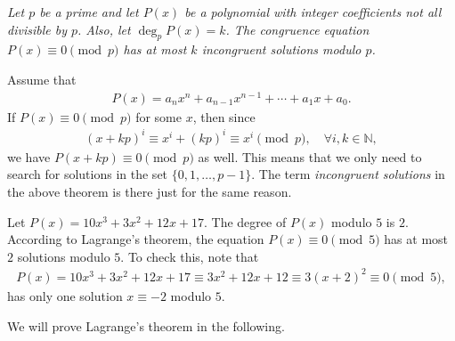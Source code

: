 \documentclass[12pt]{subfile}
\begin{document}
		
		\begin{theorem}\slshape\label{thm:lagrange}
			Let $p$ be a prime and let $P(x)$ be a polynomial with integer coefficients not all divisible by $p$. Also, let $\deg_p P(x) = k$. The congruence equation $P(x)\equiv0\pmod p$ has at most $k$ incongruent solutions modulo $p$.
		\end{theorem}
		
		\begin{note}
			Assume that
				\begin{align*}
				P(x)=a_nx^n + a_{n-1}x^{n-1} + \cdots + a_1 x +a_0.
				\end{align*}
			If $P(x) \equiv 0 \pmod p$ for some $x$, then since
				\begin{align*}
					(x+kp)^i \equiv x^i + (kp)^i \equiv x^i \pmod p, \quad \forall i,k \in \mathbb N,
				\end{align*}
			we have $P(x+kp) \equiv 0 \pmod p$ as well. This means that we only need to search for solutions in the set $\{0, 1, \ldots, p-1\}$. The term \textit{incongruent solutions} in the above theorem is there just for the same reason.
		\end{note}
		
		
		\begin{example}
			Let $P(x)=10x^3+3x^2 + 12x+17$.  The degree of $P(x)$ modulo $5$ is $2$. According to Lagrange's theorem, the equation $P(x) \equiv 0 \pmod 5$ has at most $2$ solutions modulo $5$. To check this, note that
				\begin{align*}
					P(x) = 10x^3+3x^2 + 12x+17 \equiv 3x^2 + 12x+12 \equiv 3(x+2)^2 \equiv 0 \pmod 5,
				\end{align*}
			has only one solution $x \equiv -2$ modulo $5$.
		\end{example}
	
	We will prove Lagrange's theorem in the following.
	
\end{document}
